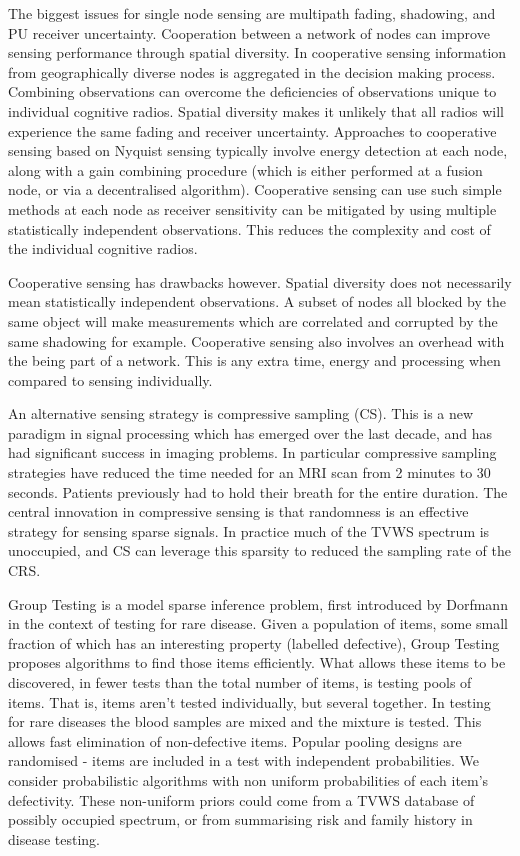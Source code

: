 \documentclass{article}
\begin{document}
The biggest issues for single node sensing are multipath fading, shadowing, and PU receiver uncertainty. Cooperation between a network of nodes can improve sensing performance through spatial diversity. In cooperative sensing information from geographically diverse nodes is aggregated in the decision making process. Combining observations can overcome the deficiencies of observations unique to individual cognitive radios. Spatial diversity makes it unlikely that all radios will experience the same fading and receiver uncertainty. Approaches to cooperative sensing based on Nyquist sensing typically involve energy detection at each node, along with a gain combining procedure (which is either performed at a fusion node, or via a decentralised algorithm). Cooperative sensing can use such simple methods at each node as receiver sensitivity can be mitigated by using multiple statistically independent observations. This reduces the complexity and cost of the individual cognitive radios.

Cooperative sensing has drawbacks however. Spatial diversity does not necessarily mean statistically independent observations. A subset of nodes all blocked by the same object will make measurements which are correlated and corrupted by the same shadowing for example. Cooperative sensing also involves an overhead with the being part of a network. This is any extra time, energy and processing when compared to sensing individually. 

An alternative sensing strategy is compressive sampling (CS). This is a new paradigm in signal processing which has emerged over the last decade, and has had significant success in imaging problems. In particular compressive sampling strategies have reduced the time needed for an MRI scan from 2 minutes to 30 seconds. Patients previously had to hold their breath for the entire duration. The central innovation in compressive sensing is that randomness is an effective strategy for sensing sparse signals. In practice much of the TVWS spectrum is unoccupied, and CS can leverage this sparsity to reduced the sampling rate of the CRS.

Group Testing is a model sparse inference problem, first introduced by Dorfmann in the context of testing for rare disease. Given a population of items, some small fraction of which has an interesting property (labelled defective), Group Testing proposes algorithms to find those items efficiently. What allows these items to be discovered, in fewer tests than the total number of items, is testing pools of items. That is, items aren't tested individually, but several together. In testing for rare diseases the blood samples are mixed and the mixture is tested. This allows fast elimination of non-defective items. Popular pooling designs are randomised - items are included in a test with independent probabilities. We consider probabilistic algorithms with non uniform probabilities of each item's defectivity. These non-uniform priors could come from a TVWS database of possibly occupied spectrum, or from summarising risk and family history in disease testing.
\end{document}
